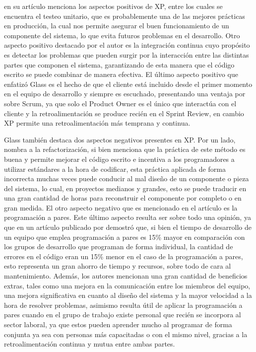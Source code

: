 \documentclass[a4paper,10pt]{article}
\begin{document}
	\textcite{glass2001extreme} en su artículo menciona los aspectos positivos de XP, entre los cuales se encuentra el testeo unitario, que es probablemente una de las mejores prácticas en producción, la cual nos permite asegurar el buen funcionamiento de un componente del sistema, lo que evita futuros problemas en el desarrollo. Otro aspecto positivo destacado por el autor es la integración continua cuyo propósito es detectar los problemas que pueden surgir por la interacción entre las distintas partes que componen el sistema, garantizando de esta manera que el código escrito se puede combinar de manera efectiva. El último aspecto positivo que enfatizó Glass es el hecho de que el cliente está incluido desde el primer momento en el equipo de desarrollo y siempre es escuchado, presentando una ventaja por sobre Scrum, ya que solo el Product Owner es el único que interactúa con el cliente y la retroalimentación se produce recién en el Sprint Review, en cambio XP permite una retroalimentación más temprana y continua.
	
	Glass también destaca dos aspectos negativos presentes en XP. Por un lado, nombra a la refactorización, si bien menciona que la práctica de este método es buena y permite mejorar el código escrito e incentiva a los programadores a utilizar estándares a la hora de codificar, esta práctica aplicada de forma incorrecta muchas veces puede conducir al mal diseño de un componente o pieza del sistema, lo cual, en proyectos medianos y grandes, esto se puede traducir en una gran cantidad de horas para reconstruir el componente por completo o en gran medida. El otro aspecto negativo que es mencionado en el artículo es la programación a pares. Este último aspecto resulta ser sobre todo una opinión, ya que en un artículo publicado por \textcite{cockburn2000costs} demostró que, si bien el tiempo de desarrollo de un equipo que emplea programación a pares es 15\% mayor en comparación con los grupos de desarrollo que programan de forma individual, la cantidad de errores en el código eran un 15\% menor en el caso de la programación a pares, esto representa un gran ahorro de tiempo y recursos, sobre todo de cara al mantenimiento. Además, los autores mencionan una gran cantidad de beneficios extras, tales como una mejora en la comunicación entre los miembros del equipo, una mejora significativa en cuanto al diseño del sistema y la mayor velocidad a la hora de resolver problemas, asimismo resulta útil de aplicar la programación a pares cuando en el grupo de trabajo existe personal que recién se incorpora al sector laboral, ya que estos pueden aprender mucho al programar de forma conjunta ya sea con personas más capacitadas o con el mismo nivel, gracias a la retroalimentación continua y mutua entre ambas partes.
\end{document}
